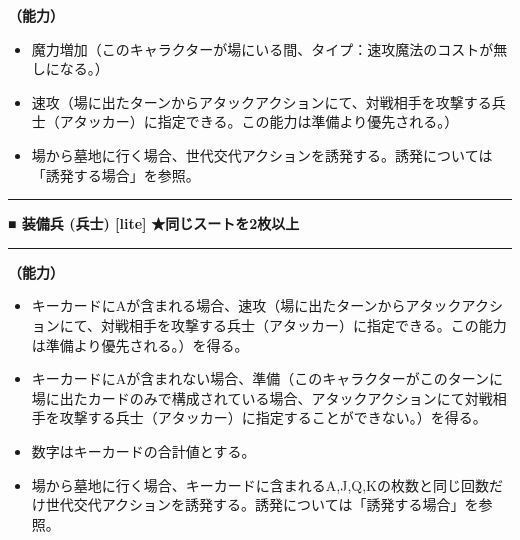 \documentclass[twocolumn,a5paper,papersize,10pt]{jarticle}
\begin{document}
{\bf（能力）}


\vspace{-1zh}%
\begin{itemize}
\setlength{\leftskip}{-0.3cm}
\setlength{\parskip}{0pt} %

\item 魔力増加（このキャラクターが場にいる間、タイプ：速攻魔法のコストが無しになる。）

\item 速攻（場に出たターンからアタックアクションにて、対戦相手を攻撃する兵士（アタッカー）に指定できる。この能力は準備より優先される。）

\item 場から墓地に行く場合、世代交代アクションを誘発する。誘発については「誘発する場合」を参照。
\vspace{-1zh}%
\end{itemize}
\vspace{2mm} %
\hrule height 0.5mm depth 0mm width 66.5mm %
\vspace{1mm} %
{\normalsize\bf ■ 装備兵 {\scriptsize (兵士) [lite]}} %
\hfill 
{\small\bf ★同じスートを2枚以上 }

\vspace{1mm}%
\hrule height 0.1mm depth 0mm width 66.5mm %
\vspace{1mm}%

{\bf（能力）}


\vspace{-1zh}%
\begin{itemize}
\setlength{\leftskip}{-0.3cm}
\setlength{\parskip}{0pt} %

\item キーカードにAが含まれる場合、速攻（場に出たターンからアタックアクションにて、対戦相手を攻撃する兵士（アタッカー）に指定できる。この能力は準備より優先される。）を得る。

\item キーカードにAが含まれない場合、準備（このキャラクターがこのターンに場に出たカードのみで構成されている場合、アタックアクションにて対戦相手を攻撃する兵士（アタッカー）に指定することができない。）を得る。

\item 数字はキーカードの合計値とする。

\item 場から墓地に行く場合、キーカードに含まれるA,J,Q,Kの枚数と同じ回数だけ世代交代アクションを誘発する。誘発については「誘発する場合」を参照。
\vspace{-1zh}%
\end{itemize}
\end{document}
